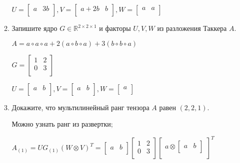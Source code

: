 \documentclass[a4paper, 11pt]{article}
\begin{document}
\begin{enumerate}
\begin{enumerate}
			$U = \begin{bmatrix}
				a & 3b \\
			\end{bmatrix}, V = \begin{bmatrix}
			a + 2b & b \\
			\end{bmatrix}, W = \begin{bmatrix}
				a & a \\
			\end{bmatrix}$
			
		\item Запишите ядро $G \in\mathbb{R}^{2\times 2 \times 1}$ и факторы $U,V,W$ из разложения Таккера $A$.
		
			$A = a \circ a \circ a + 2 (a \circ b \circ a) + 3 (b \circ b \circ a)$
			
			$G = \begin{bmatrix}
				1 & 2 \\
				0 & 3 \\
			\end{bmatrix}$
		
			$U = \begin{bmatrix}
				a & b \\
			\end{bmatrix}, V = \begin{bmatrix}
			a & b \\
				\end{bmatrix}, W = \begin{bmatrix}
				a \\
			\end{bmatrix}$
		
		\item Докажите, что мультилинейный ранг тензора $A$ равен $(2, 2, 1)$.
		
			Можно узнать ранг из развертки;
		
			$A_{(1)} = U G_{(1)} (W \otimes V)^T = \begin{bmatrix}
				a & b \\
			\end{bmatrix} \begin{bmatrix}
			1 & 2 \\
			0 & 3 \\
		\end{bmatrix} \begin{bmatrix}
		a \otimes \begin{bmatrix}
			a & b \\
		\end{bmatrix} \\
	\end{bmatrix}^T$
			

\end{enumerate}
\end{enumerate}
\end{document}

